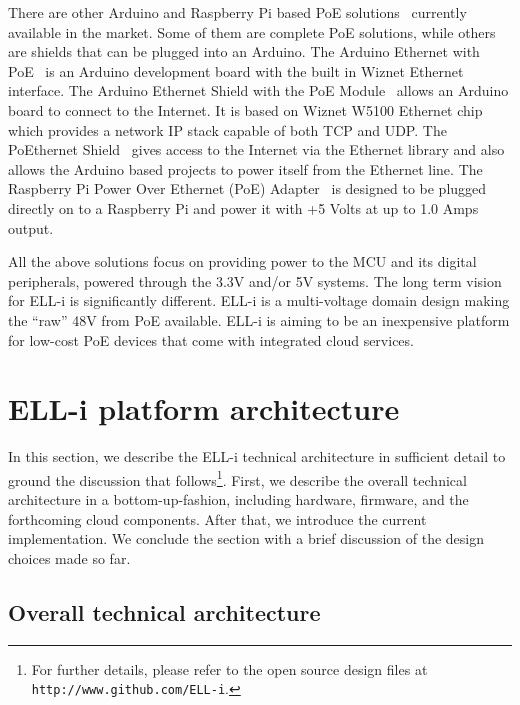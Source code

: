 \documentclass[final]{siamltex}
\begin{document}
There are other Arduino and Raspberry Pi based PoE
solutions~\cite{xtronix, ArduinoEthernetShieldPOE, ArduinoEthernetPOE, 
  POEthernetShield} currently available in
the market.  Some of them are complete PoE solutions, while others are shields
that can be plugged into an Arduino.  The Arduino Ethernet with
PoE~\cite{ArduinoEthernetPOE} is an Arduino development board with the built in
Wiznet Ethernet interface. 
The Arduino Ethernet Shield
with the PoE Module~\cite{ArduinoEthernetShieldPOE} allows an Arduino board to
connect to the Internet. It is based on Wiznet W5100 Ethernet chip which
provides a network IP stack capable of both TCP and UDP. The PoEthernet
Shield~\cite{POEthernetShield} gives access to the Internet via the Ethernet
library and also allows the Arduino based projects to power itself from the
Ethernet line. The Raspberry Pi Power Over Ethernet (PoE) Adapter~\cite{xtronix}
is designed to be plugged directly on to a
Raspberry Pi and power it with +5 Volts at up to 1.0 Amps output. 

All the above solutions focus on providing power to the MCU and its digital
peripherals, powered through the 3.3V and/or 5V systems. The long term vision
for ELL-i is significantly different. ELL-i is a multi-voltage domain design making
the ``raw'' 48V from PoE available. ELL-i is aiming to be an inexpensive
platform for low-cost PoE devices that come with integrated cloud services. 


\section{ELL-i platform architecture}
\label{sec:architecture}

In this section, we describe the ELL-i technical architecture in
sufficient detail to ground the discussion that follows\footnote{For further
details, please refer to the open source design files at
\hbox{\tt http://www.github.com/ELL-i}.}.
First, we describe the overall technical architecture in a
bottom-up-fashion, including hardware, firmware, and the forthcoming
cloud components.  After that, we introduce the current
implementation.
We
conclude the section with a brief discussion of the design choices
made so far.

\subsection{Overall technical architecture}
\end{document}
